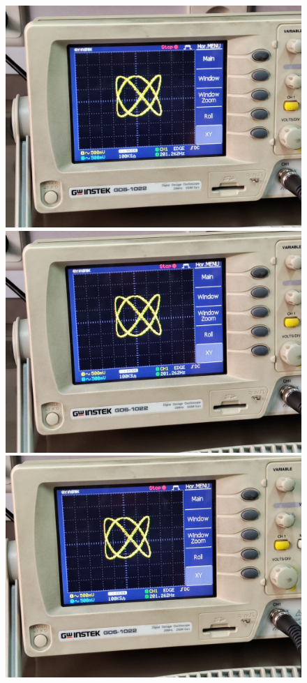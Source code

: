 \documentclass[11pt]{article}
\begin{document}
\begin{question}
{        \begin{figure}[H]
            \begin{center}
                \includegraphics[scale=0.1]{Fig/71.jpeg}
                \includegraphics[scale=0.1]{Fig/72.jpeg}
                \includegraphics[scale=0.1]{Fig/73.jpeg}

\end{center}
\end{figure}}
\end{question}
\end{document}
